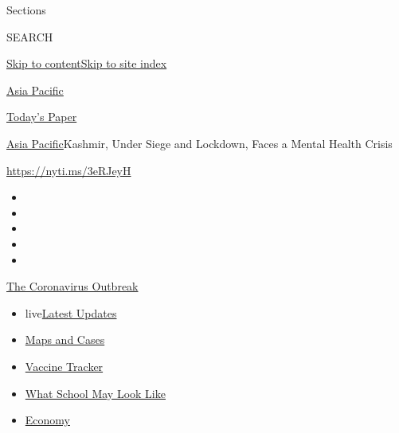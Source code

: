 Sections

SEARCH

\protect\hyperlink{site-content}{Skip to
content}\protect\hyperlink{site-index}{Skip to site index}

\href{https://www.nytimes.com/section/world/asia}{Asia Pacific}

\href{https://myaccount.nytimes.com/auth/login?response_type=cookie\&client_id=vi}{}

\href{https://www.nytimes.com/section/todayspaper}{Today's Paper}

\href{/section/world/asia}{Asia Pacific}\textbar{}Kashmir, Under Siege
and Lockdown, Faces a Mental Health Crisis

\url{https://nyti.ms/3eRJeyH}

\begin{itemize}
\item
\item
\item
\item
\item
\end{itemize}

\href{https://www.nytimes.com/news-event/coronavirus?action=click\&pgtype=Article\&state=default\&region=TOP_BANNER\&context=storylines_menu}{The
Coronavirus Outbreak}

\begin{itemize}
\tightlist
\item
  live\href{https://www.nytimes.com/2020/08/02/world/coronavirus-updates.html?action=click\&pgtype=Article\&state=default\&region=TOP_BANNER\&context=storylines_menu}{Latest
  Updates}
\item
  \href{https://www.nytimes.com/interactive/2020/us/coronavirus-us-cases.html?action=click\&pgtype=Article\&state=default\&region=TOP_BANNER\&context=storylines_menu}{Maps
  and Cases}
\item
  \href{https://www.nytimes.com/interactive/2020/science/coronavirus-vaccine-tracker.html?action=click\&pgtype=Article\&state=default\&region=TOP_BANNER\&context=storylines_menu}{Vaccine
  Tracker}
\item
  \href{https://www.nytimes.com/interactive/2020/07/29/us/schools-reopening-coronavirus.html?action=click\&pgtype=Article\&state=default\&region=TOP_BANNER\&context=storylines_menu}{What
  School May Look Like}
\item
  \href{https://www.nytimes.com/live/2020/07/31/business/stock-market-today-coronavirus?action=click\&pgtype=Article\&state=default\&region=TOP_BANNER\&context=storylines_menu}{Economy}
\end{itemize}

